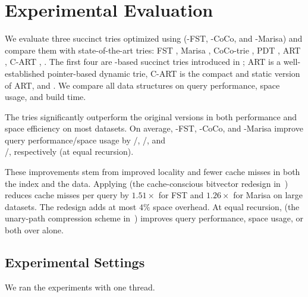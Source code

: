 \section{Experimental Evaluation}\label{sec:experiments}

We evaluate three succinct tries optimized using \csquared (\csquared-FST,
\csquared-CoCo, and \csquared-Marisa) and compare them with \numtries state-of-the-art
tries: FST \cite{surf}, Marisa \cite{marisa}, CoCo-trie \cite{coco_0, coco_1},
PDT \cite{pdt}, ART \cite{art}, C-ART \cite{hybrid_index}, . The first four are \bv-based succinct
tries introduced in ; ART is a well-established
pointer-based dynamic trie, C-ART is the compact and static version of ART, and
. We compare all
data structures on query performance, space usage, and build time.

 The \csquared tries significantly outperform the original
versions in both performance and space efficiency on most datasets.  On average,
\csquared-FST, \csquared-CoCo, and \csquared-Marisa improve query
performance/space usage by \csqfstspeedup/\csqfstspacesaving,
\csqcocospeedup/\csqcocospacesaving, and \\
\csqmarisaspeedup/\csqmarisaspacesaving, respectively (at equal recursion).

These improvements stem from improved locality and fewer cache misses in both
the index and the data. Applying \bvdesign (the cache-conscious bitvector
redesign in~) reduces cache misses per query by $1.51\times$
for FST and $1.26\times$ for Marisa on large datasets. The \bv redesign adds at
most $4\%$ space overhead. At equal recursion, \compressionscheme (the
unary-path compression scheme in~) improves query
performance, space usage, or both over \bvdesign alone.

\subsection{Experimental Settings}\label{sec:experimental-setup}



  We ran the experiments with one thread.


